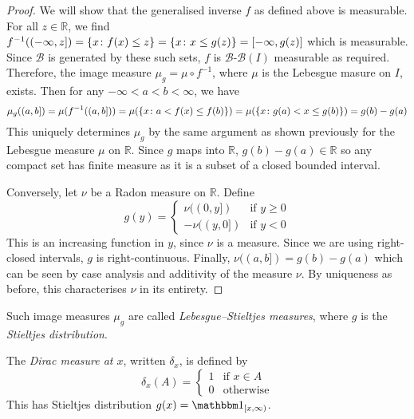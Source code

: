 \begin{proof}
	We will show that the generalised inverse \( f \) as defined above is measurable.
	For all \( z \in \mathbb R \), we find \( f^{-1}((-\infty,z]) = \qty{x \colon f(x) \leq z} = \qty{x \colon x \leq g(z)} = [-\infty,g(z)] \) which is measurable.
	Since \( \mathcal B \) is generated by these such sets, \( f \) is \( \mathcal B \)-\(\mathcal B(I) \) measurable as required.
	Therefore, the image measure \( \mu_g = \mu \circ f^{-1} \), where \( \mu \) is the Lebesgue masure on \( I \), exists.
	Then for any \( -\infty < a < b < \infty \), we have
	\[ \mu_g((a,b]) = \mu(f^{-1}((a,b])) = \mu(\qty{x \colon a < f(x) \leq f(b)}) = \mu(\qty{x \colon g(a) < x \leq g(b)}) = g(b) - g(a) \]
	This uniquely determines \( \mu_g \) by the same argument as shown previously for the Lebesgue measure \( \mu \) on \( \mathbb R \).
	Since \( g \) maps into \( \mathbb R \), \( g(b) - g(a) \in \mathbb R \) so any compact set has finite measure as it is a subset of a closed bounded interval.

	Conversely, let \( \nu \) be a Radon measure on \( \mathbb R \).
	Define
	\[ g(y) = \begin{cases}
		\nu((0,y]) & \text{if } y \geq 0 \\
		-\nu((y,0]) & \text{if } y < 0
	\end{cases} \]
	This is an increasing function in \( y \), since \( \nu \) is a measure.
	Since we are using right-closed intervals, \( g \) is right-continuous.
	Finally, \( \nu((a,b]) = g(b) - g(a) \) which can be seen by case analysis and additivity of the measure \( \nu \).
	By uniqueness as before, this characterises \( \nu \) in its entirety.
\end{proof}
\begin{remark}
	Such image measures \( \mu_g \) are called \emph{Lebesgue--Stieltjes measures}, where \( g \) is the \emph{Stieltjes distribution}.
\end{remark}
\begin{example}
	The \emph{Dirac measure at \( x \)}, written \( \delta_x \), is defined by
	\[ \delta_x(A) = \begin{cases}
		1 & \text{if } x \in A \\
		0 & \text{otherwise}
	\end{cases} \]
	This has Stieltjes distribution \( g(x) = \mathbbm 1_{[x,\infty)} \).
\end{example}


